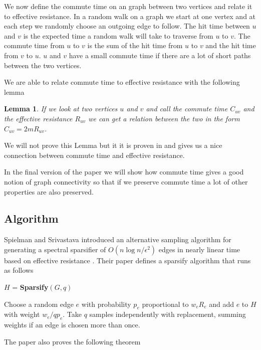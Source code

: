 \documentclass[12pt,twoside]{article}
\newtheorem{lemma}[thm]{Lemma}
\newenvironment{centered}[0]{
  \begin{list}{}{
    \setlength{\topsep}{0pt}
    \setlength{\leftmargin}{.25in}
    \setlength{\rightmargin}{.25in}
    \setlength{\listparindent}{\parindent}
    \setlength{\itemindent}{\parindent}
    \setlength{\parsep}{\parskip}
  }
  \item[]}{\end{list}}
\begin{document}
We now define the commute time on an graph between two vertices and relate it to effective resistance. In a random walk on a graph we start at one vertex and at each step we randomly choose an outgoing edge to follow. The hit time between $u$ and $v$ is the expected time a random walk will take to traverse from $u$ to $v$. The commute time from $u$ to $v$ is the sum of the hit time from $u$ to $v$ and the hit time from $v$ to $u$. $u$ and $v$ have a small commute time if there are a lot of short paths between the two vertices. 

We are able to relate commute time to effective resistance with the following lemma

\begin{lemma}
\label{lem:commute-time-effective-resist}
If we look at two vertices $u$ and $v$ and call the commute time $C_{uv}$ and the effective resistance $R_{uv}$ we can get a relation between the two in the form $C_{uv} = 2m R_{uv}$.
\end{lemma}

We will not prove this Lemma but it it is proven in \cite{wisc-effective-resistance} and gives us a nice connection between commute time and effective resistance.

In the final version of the paper we will show how commute time gives a good notion of graph connectivity so that if we preserve commute time a lot of other properties are also preserved.


\subsection{Algorithm}

Spielman and Srivastava introduced an alternative sampling algorithm for generating a spectral sparsifier of $O(n\log n/\epsilon^2)$ edges in nearly linear time based on effective resistance \cite{spielman-effective-resistance}. Their paper defines a sparsify algorithm that runs as follows

\begin{centered}
$H$ = \textbf{Sparsify}$(G,q)$

Choose a random edge $e$ with probability $p_e$ proportional to $w_e R_e$ and add $e$ to $H$ with weight $w_e/qp_e$. Take $q$ samples independently with replacement, summing weights if an edge is chosen more than once. 
\end{centered}

The paper also proves the following theorem
\end{document}

